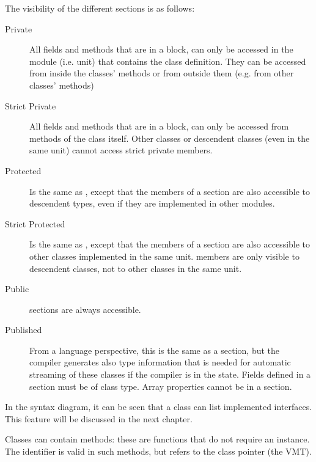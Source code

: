 The visibility of the different sections is as follows:
\begin{description}
\item [Private\ ]  All fields and methods that are in a  block, can
only be accessed in the module (i.e. unit) that contains the class definition.
They can be accessed from inside the classes' methods or from outside them
(e.g. from other classes' methods)
\item [Strict Private\ ]  All fields and methods that are in a
 block, can only be accessed from methods of the class
itself. Other classes or descendent classes (even in the same unit) cannot
access strict private members.  
\item [Protected\ ] %
Is the same as , except that the members of
a  section are also accessible to descendent types, even if
they are implemented in other modules.
\item [Strict Protected\ ] %
Is the same as , except that the members of
a  section are also accessible to other classes implemented in the
same unit.  members are only visible to descendent
classes, not to other classes in the same unit. 
\item [Public\ ]  sections are always
accessible.
\item [Published\ ]  From a
language perspective, this is the same as a  section, but the compiler generates also type 
information that is needed for automatic streaming of these classes if the compiler is in the 
 state. Fields defined in a  section must be of class type.
Array properties cannot be in a  section.
\end{description}
In the syntax diagram, it can be seen that a class can list implemented
interfaces. This feature will be discussed in the next chapter.

Classes can contain  methods: these are functions that do not
require an instance. The  identifier is valid in such methods, 
but refers to the class pointer (the VMT). 

